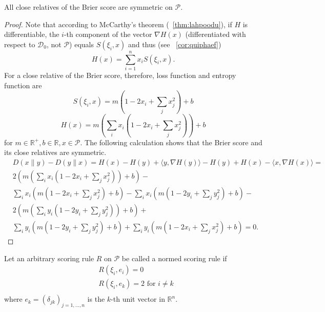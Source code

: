 \documentclass[12pt]{article}
\begin{document}
\begin{lemma}
  \label{lma:churiepe}
  All close relatives of the Brier score are symmetric on
  $\mathcal{P}$. 
\end{lemma}
\begin{proof}
  \label{prf:zahfaenu}
  Note that according to McCarthy's theorem
  ({\heorem}~\ref{thm:lahpoodu}), if $H$ is differentiable, the
  $i$-th component of the vector $\nabla{}H(x)$ (differentiated
  with respect to $\mathcal{D}_{0}$, not $\mathcal{P}$) equals
  $S(\xi_{i},x)$ and thus (see
  {\orollary}~\ref{cor:quiphaef})
\begin{equation}
  \label{eq:idiirioj}
  H(x)=\sum_{i=1}^{n}x_{i}S(\xi_{i},x).
\end{equation}
For a close relative of the Brier score, therefore, loss function
and entropy function are
\begin{equation}
  \label{eq:paegeina}
    S(\xi_{i},x)=m\left(1-2x_{i}+\sum_{j}x_{j}^{2}\right)+b
\end{equation}
\begin{equation}
  \label{eq:thughica}
    H(x)=m\left(\sum_{i}{}x_{i}\left(1-2x_{i}+\sum_{j}x_{j}^{2}\right)\right)+b
\end{equation}
for $m\in\mathbb{R}^{+},b\in\mathbb{R},x\in\mathcal{P}$. The
following calculation shows that the Brier score and its close
relatives are symmetric.
\begin{equation}
  \label{eq:uudeilah}
  \begin{split}
    & D(x\|y)-D(y\|x)=H(x)-H(y)+\langle{}y,\nabla{}H(y)\rangle-H(y)+H(x)-\langle{}x,\nabla{}H(x)\rangle= \\
    & 2\left(m\left(\sum_{i}{}x_{i}\left(1-2x_{i}+\sum_{j}x_{j}^{2}\right)\right)+b\right)- \\
    & \sum_{i}x_{i}\left(m\left(1-2x_{i}+\sum_{j}x_{j}^{2}\right)+b\right)-\sum_{i}x_{i}\left(m\left(1-2y_{i}+\sum_{j}y_{j}^{2}\right)+b\right)- \\
    & 2\left(m\left(\sum_{i}{}y_{i}\left(1-2y_{i}+\sum_{j}y_{j}^{2}\right)\right)+b\right)+ \\
    & \sum_{i}y_{i}\left(m\left(1-2y_{i}+\sum_{j}y_{j}^{2}\right)+b\right)+\sum_{i}y_{i}\left(m\left(1-2x_{i}+\sum_{j}x_{j}^{2}\right)+b\right)=0.
  \end{split}
\end{equation}
\end{proof}

\begin{definition}
  \label{def:oxoojuva}
  Let an arbitrary scoring rule $R$ on $\mathcal{P}$ be called a
  normed scoring rule if
\begin{equation}
  \label{eq:rahkaeza}
  \begin{split}
    & R(\xi_{i},e_{i})=0 \\
    & R(\xi_{i},e_{k})=2\mbox{ for }i\neq{}k \\
  \end{split}
\end{equation}
where $e_{k}=(\delta_{jk})_{j=1,\ldots,n}$ is the $k$-th unit vector
in $\mathbb{R}^{n}$. 
\end{definition}
\end{document}
